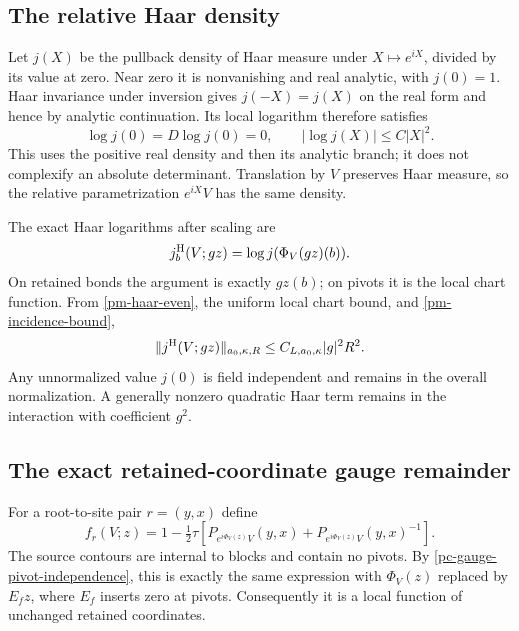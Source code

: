 \documentclass[11pt]{article}
\theoremstyle{remark}
\begin{document}
\subsection{The relative Haar density}
\label{pm-haar-section}

Let $j(X)$ be the pullback density of Haar measure under
$X\mapsto e^{iX}$, divided by its value at zero. Near zero
it is nonvanishing and real analytic, with $j(0)=1$.
Haar invariance under inversion gives $j(-X)=j(X)$ on
the real form and hence by analytic continuation. Its local
logarithm therefore satisfies
\begin{equation}\label{pm-haar-even}
 \log j(0)=D\log j(0)=0,\qquad |\log j(X)|\le C|X|^2.
\end{equation}
This uses the positive real density and then its analytic
branch; it does not complexify an absolute determinant.
Translation by $V$ preserves Haar measure, so the relative
parametrization $e^{iX}V$ has the same density.

The exact Haar logarithms after scaling are
\begin{equation}\label{pm-haar-log}
 j_b^{\rm H}(V;gz)=\log j(\Phi_V(gz)(b)).
\end{equation}
On retained bonds the argument is exactly $gz(b)$; on pivots
it is the local chart function. From
\eqref{pm-haar-even}, the uniform local chart bound, and
\eqref{pm-incidence-bound},
\begin{equation}\label{pm-haar-bound}
 \|j^{\rm H}(V;gz)\|_{a_0,\kappa,R}
 \le C_{L,a_0,\kappa}|g|^2R^2.
\end{equation}
Any unnormalized value $j(0)$ is field independent and remains
in the overall normalization. A generally nonzero quadratic
Haar term remains in the interaction with coefficient $g^2$.

\subsection{The exact retained-coordinate gauge remainder}
\label{pm-gauge-section}

For a root-to-site pair $r=(y,x)$ define
\begin{equation}\label{pm-gauge-primitive}
 f_r(V;z)=1-\tfrac12\tau\left[
 P_{e^{i\Phi_V(z)}V}(y,x)
 +P_{e^{i\Phi_V(z)}V}(y,x)^{-1}\right].
\end{equation}
The source contours are internal to blocks and contain no
pivots. By \eqref{pc-gauge-pivot-independence}, this is
exactly the same expression with $\Phi_V(z)$ replaced by
$E_fz$, where $E_f$ inserts zero at pivots. Consequently
it is a local function of unchanged retained coordinates.
\end{document}

